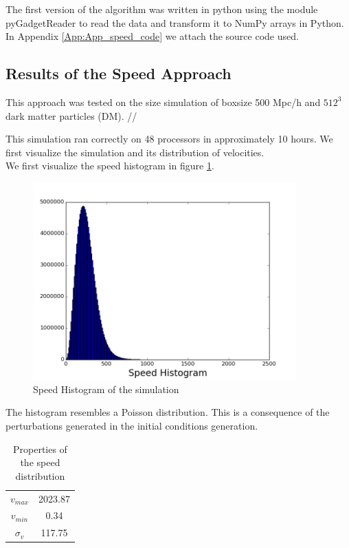 \documentclass[12pt]{article}
\begin{document}
The first version of the algorithm was written in python using the module
pyGadgetReader \cite{thompson_pygadgetreader_2014ascl_soft11001T} to read the
data and transform it to NumPy arrays in Python. In Appendix \ref{App:App_speed_code} we attach the source code used.

\subsection{Results of the Speed Approach}
This approach was tested on the size simulation of boxsize 500 Mpc/h
and $512^{3}$ dark matter particles (DM). //

This simulation ran correctly on 48 processors in approximately 10 hours. We first visualize the simulation and its distribution of velocities. \\

We first visualize the speed histogram in figure \ref{fg:hist_vel}.\\

\begin{figure}[ht]
\begin{center}
\includegraphics[width=0.9\textwidth]{graphs/hist_vel.png} %
\caption{Speed Histogram of the simulation}
\label{fg:hist_vel}
\end{center}
\end{figure}
\FloatBarrier

The histogram resembles a Poisson distribution. This is a consequence of the perturbations generated in the initial conditions generation. 

\begin{table}[ht]
    \centering
    \begin{tabular}{|c|c|}
        $v_{max}$ & 2023.87 \\
        $v_{min}$ & 0.34\\
        $\sigma_{v}$ & 117.75 
    \end{tabular}
    \caption{Properties of the speed distribution}
    \label{tab:vel}
\end{table}
\FloatBarrier
\end{document}
